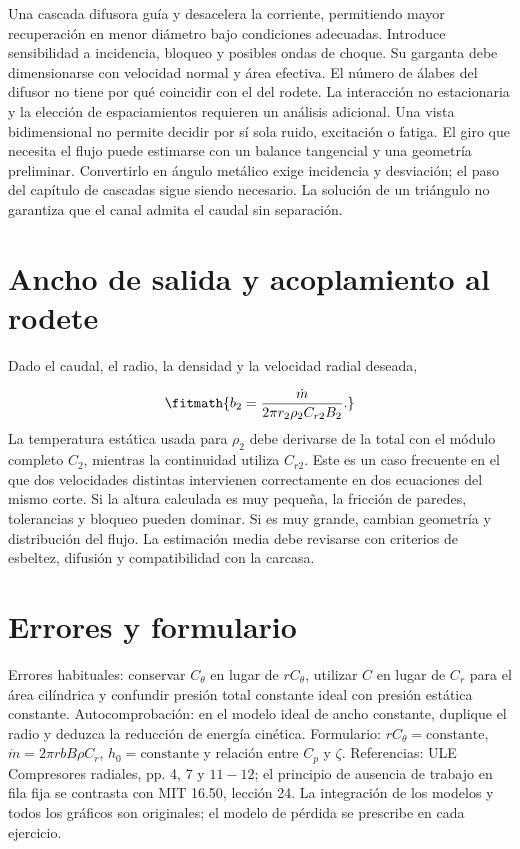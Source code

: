 \documentclass[10pt,openany]{book}
\begin{document}
Una cascada difusora guía y desacelera la corriente, permitiendo mayor recuperación en menor diámetro bajo condiciones adecuadas. Introduce sensibilidad a incidencia, bloqueo y posibles ondas de choque. Su garganta debe dimensionarse con velocidad normal y área efectiva.
El número de álabes del difusor no tiene por qué coincidir con el del rodete. La interacción no estacionaria y la elección de espaciamientos requieren un análisis adicional. Una vista bidimensional no permite decidir por sí sola ruido, excitación o fatiga.
El giro que necesita el flujo puede estimarse con un balance tangencial y una geometría preliminar. Convertirlo en ángulo metálico exige incidencia y desviación; el paso del capítulo de cascadas sigue siendo necesario. La solución de un triángulo no garantiza que el canal admita el caudal sin separación.

\section{Ancho de salida y acoplamiento al rodete}


Dado el caudal, el radio, la densidad y la velocidad radial deseada,



\[
\fitmath{b_2=\frac{\dot m}{2\pi r_2\rho_2C_{r2}B_2}.}
\]
La temperatura estática usada para \(\rho_2\) debe derivarse de la total con el módulo completo \(C_2\), mientras la continuidad utiliza \(C_{r2}\). Este es un caso frecuente en el que dos velocidades distintas intervienen correctamente en dos ecuaciones del mismo corte.
Si la altura calculada es muy pequeña, la fricción de paredes, tolerancias y bloqueo pueden dominar. Si es muy grande, cambian geometría y distribución del flujo. La estimación media debe revisarse con criterios de esbeltez, difusión y compatibilidad con la carcasa.

\section{Errores y formulario}

Errores habituales: conservar \(C_\theta\) en lugar de \(rC_\theta\), utilizar \(C\) en lugar de \(C_r\) para el área cilíndrica y confundir presión total constante ideal con presión estática constante. Autocomprobación: en el modelo ideal de ancho constante, duplique el radio y deduzca la reducción de energía cinética.
Formulario: \(rC_\theta=\mathrm{constante}\), \(\dot m=2\pi rbB\rho C_r\), \(h_0=\mathrm{constante}\) y relación entre \(C_p\) y \(\zeta\). Referencias: ULE Compresores radiales, pp. 4, 7 y \(11-12\); el principio de ausencia de trabajo en fila fija se contrasta con MIT 16.50, lección 24. La integración de los modelos y todos los gráficos son originales; el modelo de pérdida se prescribe en cada ejercicio.
\end{document}
